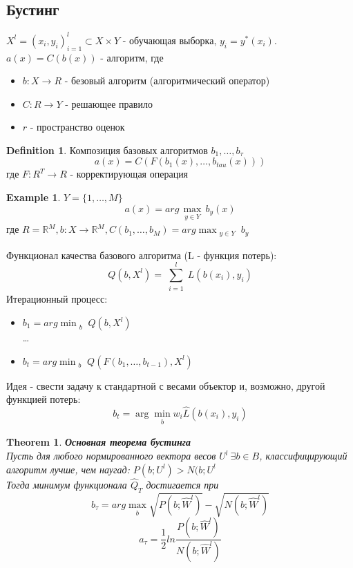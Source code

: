 \documentclass[a4paper]{article}
\theoremstyle{plain}
\newtheorem{theorem}{Theorem}
\theoremstyle{remark}
\theoremstyle{definition}
\newtheorem{definition}{Definition}
\newtheorem{example}{Example}
\newcommand{\setR}{\mathbb{R}}
\begin{document}
\subsection{Бустинг}
$X^l=(x_i,y_i)_{i=1}^l \subset X \times Y$ - обучающая выборка, $y_i=y^*(x_i)$. \\
$a(x)=C(b(x))$ - алгоритм, где \begin{itemize}
	\item $b: X \rightarrow R$ - безовый алгоритм (алгоритмический оператор)
	\item $C: R \rightarrow Y$ - решающее правило
	\item $r$ - пространство оценок
\end{itemize}
\begin{definition}
Композиция базовых алгоритмов $b_1, \ldots, b_{\tau}$
$$a(x) = C(F(b_1(x), \ldots, b_{tau}(x)))$$ где $F:R^T \rightarrow R$ - корректирующая операция
\end{definition}
\begin{example} 
$Y=\{1, \ldots, M\}$
$$a(x) = arg \max_{\substack{y \in Y}}b_y(x)$$ где $R=\setR^M, b: X \rightarrow \setR^M, C(b_1, \ldots, b_M)=arg \max_{\substack{y \in Y}} b_y$
\end{example}
Функционал качества базового алгоритма (L - функция потерь):
$$ Q(b,X^l) = \sum_{\substack{i=1}}^l L(b(x_i),y_i) $$
Итерационный процесс: \begin{itemize}
	\item $b_1 = arg \min_{\substack{b}} Q(b, X^l) $\\
	\ldots
	\item $b_t = arg \min_{\substack{b}} Q(F(b_1, \ldots, b_{t-1}), X^l)$
\end{itemize}
Идея - свести задачу к стандартной с весами объектор и, возможно, другой функцией потерь:
$$ b_t = \arg \min_{\substack{b}} w_i \hat{L}(b(x_i), y_i) $$

\begin{theorem} \textbf{Основная теорема бустинга} \\
Пусть для любого нормированного вектора весов $U^l \ \exists b \in B$, классифицирующий алгоритм лучше, чем наугад: $P(b;U^l)>N(b;U^l$ \\
Тогда минимум функционала $\hat{Q}_T$ достигается при
$$ b_{\tau} = arg \max_{\substack{b}} \sqrt{P(b;\hat{W}^l)} - \sqrt{N(b;\hat{W}^l)} $$
$$ a_{\tau} = \frac{1}{2} ln \frac{{P(b;\hat{W}^l)}}{{N(b;\hat{W}^l)}} $$
\end{theorem}
\end{document}
